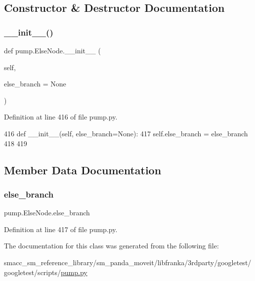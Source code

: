 \subsection{Constructor \& Destructor Documentation}
\mbox{\label{classpump_1_1ElseNode_a7489ff8c6c7ddfe6bd6593b8ecccd819}} 
\subsubsection{\texorpdfstring{\+\_\+\+\_\+init\+\_\+\+\_\+()}{\_\_init\_\_()}}
{\footnotesize\ttfamily def pump.\+Else\+Node.\+\_\+\+\_\+init\+\_\+\+\_\+ (\begin{DoxyParamCaption}\item[{}]{self,  }\item[{}]{else\+\_\+branch = {\ttfamily None} }\end{DoxyParamCaption})}



Definition at line 416 of file pump.\+py.


\begin{DoxyCode}
416   \textcolor{keyword}{def }\_\_init\_\_(self, else\_branch=None):
417     self.else\_branch = else\_branch
418 
419 
\end{DoxyCode}


\subsection{Member Data Documentation}
\mbox{\label{classpump_1_1ElseNode_ac838a0fe9f5d713c7f56939eed5e128d}} 
\subsubsection{\texorpdfstring{else\+\_\+branch}{else\_branch}}
{\footnotesize\ttfamily pump.\+Else\+Node.\+else\+\_\+branch}



Definition at line 417 of file pump.\+py.



The documentation for this class was generated from the following file\+:\begin{DoxyCompactItemize}
\item 
smacc\+\_\+sm\+\_\+reference\+\_\+library/sm\+\_\+panda\+\_\+moveit/libfranka/3rdparty/googletest/googletest/scripts/\hyperlink{pump_8py}{pump.\+py}\end{DoxyCompactItemize}
